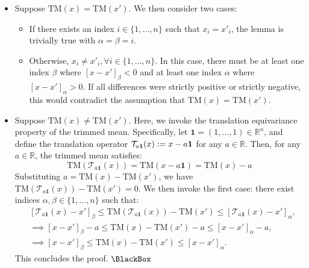 \documentclass[twoside,11pt]{article}
\newcommand\mc{\mathcal}
\newcommand\mb{\mathbb}
\begin{document}
    \begin{itemize}
        \item[\textit{(i)}] Suppose $\mathrm{TM}(x) = \mathrm{TM}(x')$. We then consider two cases:
            \begin{itemize}
                \item If there exists an index $i \in \{1, \ldots, n\}$ such that $x_i = x'_i$, the lemma is trivially true with $\alpha = \beta = i$.
                \item Otherwise, $x_i \neq x'_i, \forall i \in \{1, \ldots, n\}$. In this case, there must be at least one index
                $\beta$ where ${\left[x - x' \right]}_\beta < 0$ and at least one index $\alpha$ where ${\left[x - x' \right]}_\alpha > 0$.
                If all differences were strictly positive or strictly negative, this would contradict the assumption that $\mathrm{TM}(x) = \mathrm{TM}(x')$.
            \end{itemize}
        \item[\textit{(ii)}] Suppose $\mathrm{TM}(x) \neq \mathrm{TM}(x')$. Here, we invoke the translation equivariance property of the trimmed mean. Specifically,  
        let $\mathbf{1} = (1, \ldots, 1) \in \mb{R}^n$, and define the translation operator $\mc{T}_{a\mathbf{1}}(x) \vcentcolon= x - a\mathbf{1}$ for any $a \in \mb{R}$.
        Then, for any $a \in \mb{R}$, the trimmed mean satisfies:
        \[
            \mathrm{TM}(\mc{T}_{a\mathbf{1}}(x)) = \mathrm{TM}(x - a\mathbf{1}) = \mathrm{TM}(x) - a
        \]
        Substituting $a = \mathrm{TM}(x) - \mathrm{TM}(x')$, we have \( \mathrm{TM}(\mc{T}_{a\mathbf{1}}(x)) - \mathrm{TM}(x') = 0 \). We then invoke the first case: there exist indices $\alpha, \beta \in \{1, \ldots, n\}$ such that: 
        \begin{align*}
            &{\left[ \mc{T}_{a\mathbf{1}}(x) - x' \right]}_\beta \leq  \mathrm{TM}(\mc{T}_{a\mathbf{1}}(x)) - \mathrm{TM}(x')  \leq  {\left[ \mc{T}_{a\mathbf{1}}(x) - x' \right]}_\alpha , \\
            & \implies  {\left[ x - x' \right]}_\beta - a  \leq  \mathrm{TM}(x) - \mathrm{TM}(x') - a  \leq  {\left[ x - x' \right]}_\alpha - a ,\\
            & \implies {\left[ x - x' \right]}_\beta  \leq  \mathrm{TM}(x) - \mathrm{TM}(x')  \leq  {\left[ x - x' \right]}_\alpha .
        \end{align*}
        This concludes the proof. \hfill$\BlackBox$
    \end{itemize}
\end{document}
